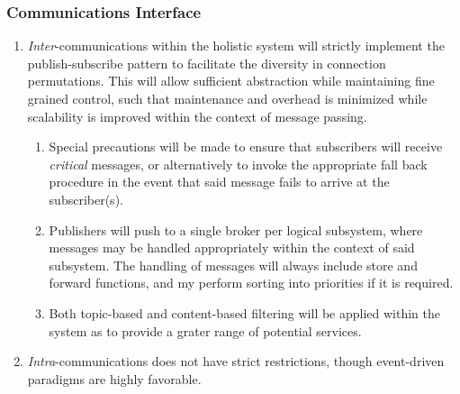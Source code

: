 \subsubsection{Communications Interface}
\begin{enumerate}
	\item \textit{Inter}-communications within the holistic system will strictly implement the publish-subscribe pattern to facilitate the diversity in connection permutations. This will allow sufficient abstraction while maintaining fine grained control, such that maintenance and overhead is minimized while scalability is improved within the context of message passing.
	\begin{enumerate}
		\item Special precautions will be made to ensure that subscribers will receive \textit{critical} messages, or alternatively to invoke the appropriate fall back procedure in the event that said message fails to arrive at the subscriber(s).
		
		\item Publishers will push to a single broker per logical subsystem, where messages may be handled appropriately within the context of said subsystem. The handling of messages will always include store and forward functions, and my perform sorting into priorities if it is required.
		
		\item Both topic-based and content-based filtering will be applied within the system as to provide a grater range of potential services.
	\end{enumerate}
	\item \textit{Intra}-communications does not have strict restrictions, though event-driven paradigms are highly favorable.
\end{enumerate}


